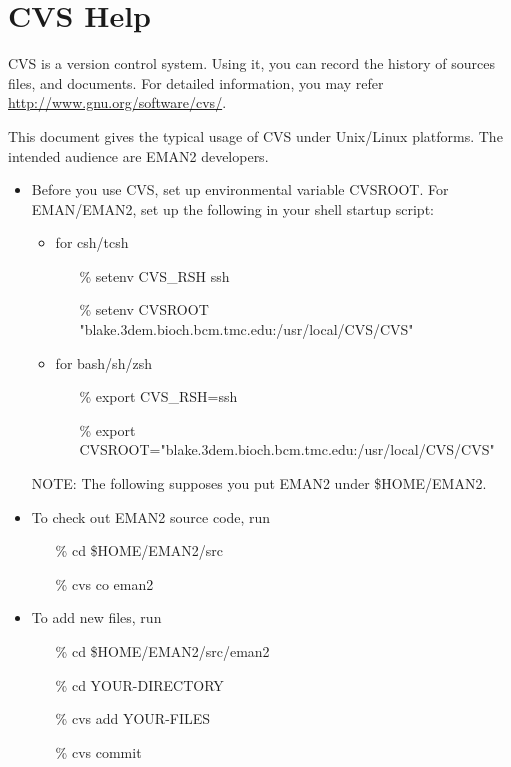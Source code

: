 \section{CVS Help} \label{CVS-HELP} 
CVS is a version control system. Using it, you can record the history of sources files, and documents. For detailed information, you may refer \href{http://www.gnu.org/software/cvs/}{http://www.gnu.org/software/cvs/}.

This document gives the typical usage of CVS under Unix/Linux
platforms. The intended audience are EMAN2 developers.

\begin{itemize}
  \item Before you use CVS, set up environmental variable CVSROOT. For
  EMAN/EMAN2, set up the following in your shell startup script:
  \begin{itemize}
    \item for csh/tcsh
      \begin{itemize} \color{blue}
	\item[\%] setenv CVS\_RSH ssh
	\item[\%] setenv CVSROOT
	"blake.3dem.bioch.bcm.tmc.edu:/usr/local/CVS/CVS"
      \end{itemize}
    \item for bash/sh/zsh
      \begin{itemize} \color{blue}
	\item[\%] export CVS\_RSH=ssh
	\item[\%] export
	CVSROOT="blake.3dem.bioch.bcm.tmc.edu:/usr/local/CVS/CVS"
      \end{itemize}
  \end{itemize}
  NOTE: The following supposes you put EMAN2 under \$HOME/EMAN2.

  \item  To check out EMAN2 source code, run
    \begin{itemize} \color{blue}
        \item[\%] cd \$HOME/EMAN2/src
        \item[\%] cvs co eman2
    \end{itemize}
  \item To add new files, run
    \begin{itemize} \color{blue}
      \item[\%] cd \$HOME/EMAN2/src/eman2
      \item[\%] cd YOUR-DIRECTORY
      \item[\%] cvs add YOUR-FILES
      \item[\%] cvs commit
    \end{itemize}
	

\end{itemize}
